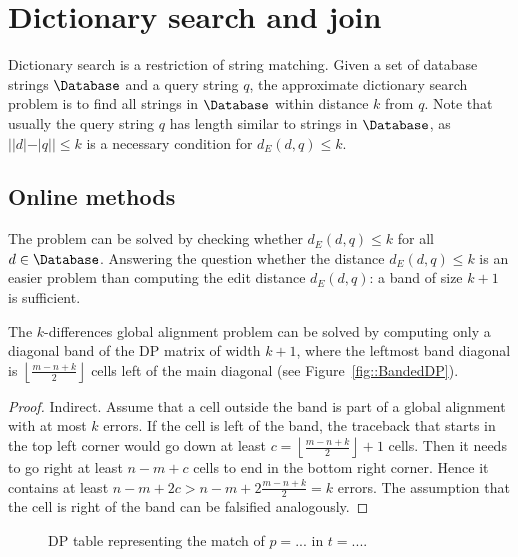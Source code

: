 \chapter{Dictionary search and join}

Dictionary search is a restriction of string matching.
Given a set of database strings $\Database$ and a query string $q$, the approximate dictionary search problem is to find all strings in $\Database$ within distance $k$ from $q$.
Note that usually the query string $q$ has length similar to strings in $\Database$, as $| |d| - |q| | \leq k$ is a necessary condition for $d_E(d,q) \leq k$.

\section{Online methods}

The problem can be solved by checking whether $d_E(d,q) \leq k$ for all $d \in \Database$.
Answering the question whether the distance $d_E(d,q) \leq k$ is an easier problem than computing the edit distance $d_E(d,q)$: a band of size $k+1$ is sufficient.

\begin{lemma}
\label{lemma:kband}
The $k$-differences global alignment problem can be solved by computing only a diagonal band of the DP matrix of width $k+1$, where the leftmost band diagonal is $\left\lfloor\frac{m-n+k}{2}\right\rfloor$ cells left of the main diagonal (see Figure~\ref{fig::BandedDP}).
\end{lemma}
\begin{proof}
Indirect. Assume that a cell outside the band is part of a global alignment with at most $k$ errors.
If the cell is left of the band, the traceback that starts in the top left corner would go down at least $c=\left\lfloor\frac{m-n+k}{2}\right\rfloor+1$ cells. Then it needs to go right at least $n-m+c$ cells to end in the bottom right corner.
Hence it contains at least $n-m+2c>n-m+2\frac{m-n+k}{2}=k$ errors.
The assumption that the cell is right of the band can be falsified analogously.
\end{proof}

\begin{figure}[h]
\begin{center}
\caption[Example of $k$-differences global aligment via DP.]{DP table representing the match of $p=...$ in $t=...$.}
\label{fig:dict-dp}

\end{center}
\end{figure}

